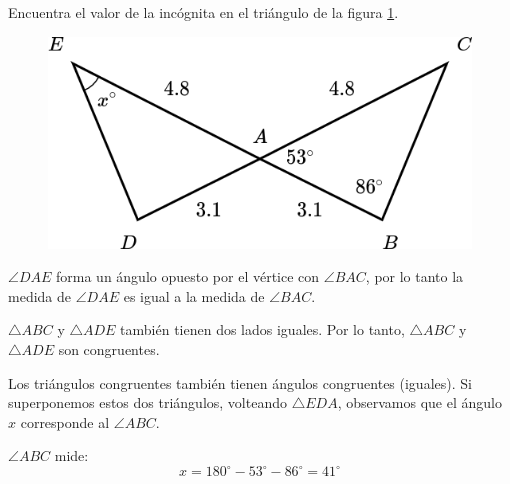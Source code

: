Encuentra el valor de la incógnita en el triángulo de la figura \ref{fig:angle_triangle_31}.

\begin{minipage}[t][][t]{0.35\textwidth}
    \begin{figure}[H]
        \centering
        \includegraphics[width=\linewidth]{../images/angle_triangle_31.png}
        \caption{}
        \label{fig:angle_triangle_31}
    \end{figure}
\end{minipage}\hfill
\begin{minipage}[t][][t]{0.6\textwidth}
    \begin{solutionbox}{4.5cm}
        $\angle DAE$ forma un ángulo opuesto por el vértice con $\angle BAC$, por lo tanto la medida de $\angle DAE$ es igual a la medida de $\angle BAC$.

        $\triangle ABC$ y $\triangle ADE$ también tienen dos lados iguales. Por lo tanto,
        $\triangle ABC$ y $\triangle ADE$ son congruentes.

        Los triángulos congruentes también tienen ángulos congruentes (iguales). Si superponemos estos dos triángulos, volteando $\triangle EDA$, observamos que el ángulo $x$ corresponde al $\angle ABC$.

        $\angle ABC$ mide: \[x=180^\circ-53^\circ-86^\circ=41^\circ\]
    \end{solutionbox}
\end{minipage}

